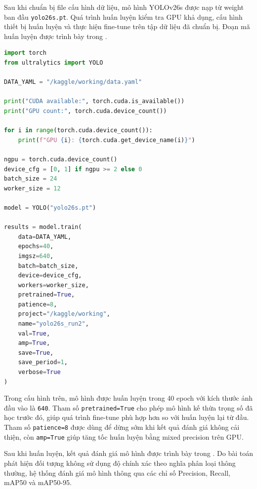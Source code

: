 Sau khi chuẩn bị file cấu hình dữ liệu, mô hình YOLOv26s được nạp từ weight ban đầu \texttt{yolo26s.pt}. Quá trình huấn luyện kiểm tra GPU khả dụng, cấu hình thiết bị huấn luyện và thực hiện fine-tune trên tập dữ liệu đã chuẩn bị. Đoạn mã huấn luyện được trình bày trong .

\begin{lstlisting}[language=Python,caption={Fine-tune mô hình YOLOv26s trên tập dữ liệu thời trang},label={lst:yolo-train}]
import torch
from ultralytics import YOLO

DATA_YAML = "/kaggle/working/data.yaml"

print("CUDA available:", torch.cuda.is_available())
print("GPU count:", torch.cuda.device_count())

for i in range(torch.cuda.device_count()):
    print(f"GPU {i}: {torch.cuda.get_device_name(i)}")

ngpu = torch.cuda.device_count()
device_cfg = [0, 1] if ngpu >= 2 else 0
batch_size = 24
worker_size = 12

model = YOLO("yolo26s.pt")

results = model.train(
    data=DATA_YAML,
    epochs=40,
    imgsz=640,
    batch=batch_size,
    device=device_cfg,
    workers=worker_size,
    pretrained=True,
    patience=8,
    project="/kaggle/working",
    name="yolo26s_run2",
    val=True,
    amp=True,
    save=True,
    save_period=1,
    verbose=True
)
\end{lstlisting}

Trong cấu hình trên, mô hình được huấn luyện trong 40 epoch với kích thước ảnh đầu vào là \texttt{640}. Tham số \texttt{pretrained=True} cho phép mô hình kế thừa trọng số đã học trước đó, giúp quá trình fine-tune phù hợp hơn so với huấn luyện lại từ đầu. Tham số \texttt{patience=8} được dùng để dừng sớm khi kết quả đánh giá không cải thiện, còn \texttt{amp=True} giúp tăng tốc huấn luyện bằng mixed precision trên GPU.

Sau khi huấn luyện, kết quả đánh giá mô hình được trình bày trong . Do bài toán phát hiện đối tượng không sử dụng độ chính xác theo nghĩa phân loại thông thường, hệ thống đánh giá mô hình thông qua các chỉ số Precision, Recall, mAP50 và mAP50-95.

